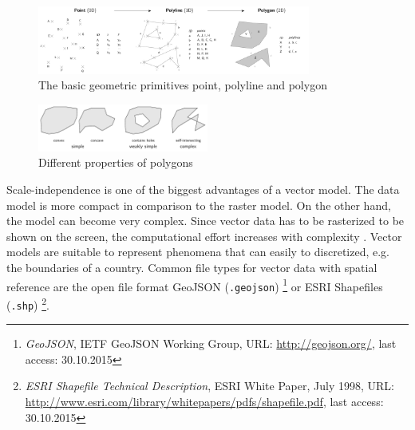 \begin{figure}[H]
  \centering
  \includegraphics[width=0.8\textwidth]{graphics/basics/geometric_primitives}
  \caption{The basic geometric primitives point, polyline and polygon}
  \label{fig:geometric_primitives}
\end{figure}


\begin{figure}[H]
  \centering
  \includegraphics[width=0.5\textwidth]{graphics/basics/polygon_properties}
  \caption{Different properties of polygons}
  \label{fig:polygon_properties}
\end{figure}

Scale-independence is one of the biggest advantages of a vector model. The data model is more compact in comparison to the raster model. On the other hand, the model can become very complex. Since vector data has to be rasterized to be shown on the screen, the computational effort increases with complexity \cite[pp.33-42]{bolstad2008gis}.
Vector models are suitable to represent phenomena that can easily to discretized, e.g. the boundaries of a country. Common file types for vector data with spatial reference are the open file format GeoJSON (\texttt{.geojson})
\footnote{
  \emph{GeoJSON},
  IETF GeoJSON Working Group,
  URL: \url{http://geojson.org/},
  last access: 30.10.2015
}
or ESRI Shapefiles (\texttt{.shp})
\footnote{
  \emph{ESRI Shapefile Technical Description},
  ESRI White Paper, July 1998,
  URL: \url{http://www.esri.com/library/whitepapers/pdfs/shapefile.pdf},
  last access: 30.10.2015
}.



